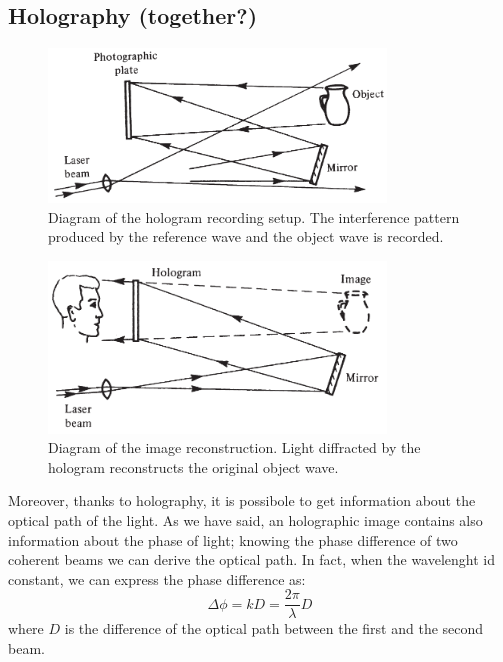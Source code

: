 \documentclass[11pt,a4paper]{article}
\begin{document}
\subsection{Holography (together?)}\label{sec:Holo}

\begin{figure}[ht]
\centering
\includegraphics[width=0.8\textwidth]{Hologram_recording}
\caption{Diagram of the hologram recording setup. The interference pattern produced by the reference wave and the object wave is recorded.\cite{hariharan_2002}}
\label{fig:hologram_recording}
\end{figure}

\begin{figure}[ht]
\centering
\includegraphics[width=0.8\textwidth]{Hologram_image_reconstruction}
\caption{Diagram of the image reconstruction. Light diffracted by the hologram reconstructs the original object wave.\cite{hariharan_2002}}
\label{fig:hologram_reconstruction}
\end{figure}

Moreover, thanks to holography, it is possibole to get information about the optical path of the light. As we have said, an holographic image contains also information about the phase of light; knowing the phase difference of two coherent beams we can derive the optical path. In fact, when the wavelenght id constant, we can express the phase difference as:
\begin{equation}
\Delta \phi=kD=\frac{2\pi}{\lambda}D\label{eq:Delphi}
\end{equation}
where $D$ is the difference of the optical path between the first and the second beam.
\end{document}
